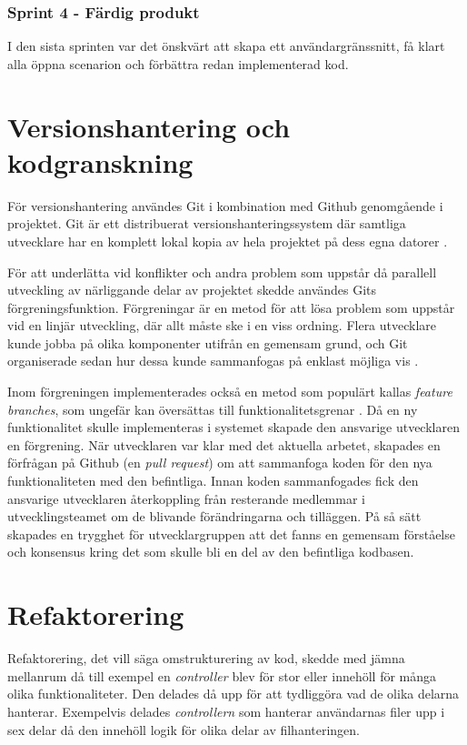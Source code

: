 \subsubsection{Sprint 4 - Färdig produkt}
I den sista sprinten var det önskvärt att skapa ett användargränssnitt, få klart alla öppna scenarion och förbättra redan implementerad kod.

\section{Versionshantering och kodgranskning}
För versionshantering användes Git i kombination med Github genomgående i projektet. Git är ett distribuerat versionshanteringssystem där samtliga utvecklare har en komplett lokal kopia av hela projektet på dess egna datorer \cite{progit}.

För att underlätta vid konflikter och andra problem som uppstår då parallell utveckling av närliggande delar av projektet skedde användes Gits förgreningsfunktion. Förgreningar är en metod för att lösa problem som uppstår vid en linjär utveckling, där allt måste ske i en viss ordning. Flera utvecklare kunde jobba på olika komponenter utifrån en gemensam grund, och Git organiserade sedan hur dessa kunde sammanfogas på enklast möjliga vis \cite{progit}.

Inom förgreningen implementerades också en metod som populärt kallas \textit{feature branches}, som ungefär kan översättas till funktionalitetsgrenar \cite{gitflow}. Då en ny funktionalitet skulle implementeras i systemet skapade den ansvarige utvecklaren en förgrening. När utvecklaren var klar med det aktuella arbetet, skapades en förfrågan på Github (en \textit{pull request}) om att sammanfoga koden för den nya funktionaliteten med den befintliga. Innan koden sammanfogades fick den ansvarige utvecklaren återkoppling från resterande medlemmar i utvecklingsteamet om de blivande förändringarna och tilläggen. På så sätt skapades en trygghet för utvecklargruppen att det fanns en gemensam förståelse och konsensus kring det som skulle bli en del av den befintliga kodbasen.

\section{Refaktorering}
Refaktorering, det vill säga omstrukturering av kod, skedde med jämna mellanrum då till exempel en \textit{controller} blev för stor eller innehöll för många olika funktionaliteter. Den delades då upp för att tydliggöra vad de olika delarna hanterar. Exempelvis delades \textit{controllern} som hanterar användarnas filer upp i sex delar då den innehöll logik för olika delar av filhanteringen.
